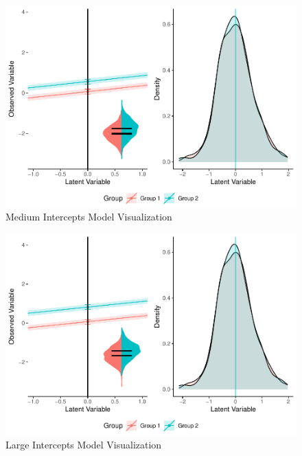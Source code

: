 \documentclass[
  man]{apa6}
\begin{document}
\begin{figure}
\centering
\includegraphics{manuscript_files/figure-latex/med-int-pic-1.pdf}
\caption{\label{fig:med-int-pic}Medium Intercepts Model Visualization}
\end{figure}

\begin{figure}
\centering
\includegraphics{manuscript_files/figure-latex/large-int-pic-1.pdf}
\caption{\label{fig:large-int-pic}Large Intercepts Model Visualization}
\end{figure}
\end{document}
